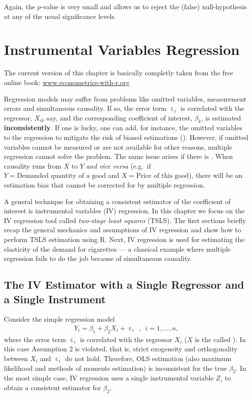 \documentclass[
  14pt,
]{memoir}
\DeclareMathOperator{\eps}{\varepsilon}
\begin{document}
Again, the \(p\)-value is very small and allows us to reject the (false) null-hypothesis at any of the usual significance levels.

\hypertarget{ivr}{%
\chapter{Instrumental Variables Regression}\label{ivr}}

The current version of this chapter is basically completly taken from the free online book: \url{www.econometrics-with-r.org} \citep{Hanck_et_al_2019}

\bigskip

Regression models may suffer from problems like omitted variables, measurement errors and simultaneous causality. If so, the error term \(\eps_i\) is correlated with the regressor, \(X_{ik}\) say, and the corresponding coefficient of interest, \(\beta_k\), is estimated \textbf{inconsistently}. If one is lucky, one can add, for instance, the omitted variables to the regression to mitigate the risk of biased estimations (). However, if omitted variables cannot be measured or are not available for other reasons, multiple regression cannot solve the problem. The same issue arises if there is . When causality runs from \(X\) to \(Y\) \emph{and vice versa} (e.g.~if \(Y=\text{Demanded quantity of a good}\) and \(X=\text{Price of this good}\)), there will be an estimation bias that cannot be corrected for by multiple regression.

A general technique for obtaining a consistent estimator of the coefficient of interest is instrumental variables (IV) regression. In this chapter we focus on the IV regression tool called \emph{two-stage least squares} (TSLS). The first sections briefly recap the general mechanics and assumptions of IV regression and show how to perform TSLS estimation using \textsf{R}. Next, IV regression is used for estimating the elasticity of the demand for cigarettes --- a classical example where multiple regression fails to do the job because of simultaneous causality.

\hypertarget{TIVEWASRAASI}{%
\section{The IV Estimator with a Single Regressor and a Single Instrument}\label{TIVEWASRAASI}}

Consider the simple regression model
\begin{align}
  Y_i = \beta_1 + \beta_2 X_i + \eps_i \ \ , \ \ i=1,\dots,n, \label{eq:srm12}
\end{align}
where the error term \(\eps_i\) is correlated with the regressor \(X_i\) (\(X\) is the called ). In this case Assumption 2 is violated, that is, strict exogeneity and orthogonality between \(X_i\) and \(\eps_i\) do not hold. Therefore, OLS estimation (also maximum likelihood and methods of moments estimation) is inconsistent for the true \(\beta_2\). In the most simple case, IV regression uses a single instrumental variable \(Z_i\) to obtain a consistent estimator for \(\beta_2\).
\end{document}

